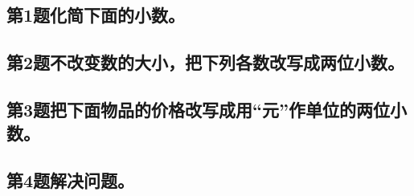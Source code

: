 \subsection*{第1题\quad 化简下面的小数。}
\subsection*{第2题\quad 不改变数的大小，把下列各数改写成两位小数。}
\subsection*{第3题\quad 把下面物品的价格改写成用“元”作单位的两位小数。}
\subsection*{第4题\quad 解决问题。}
